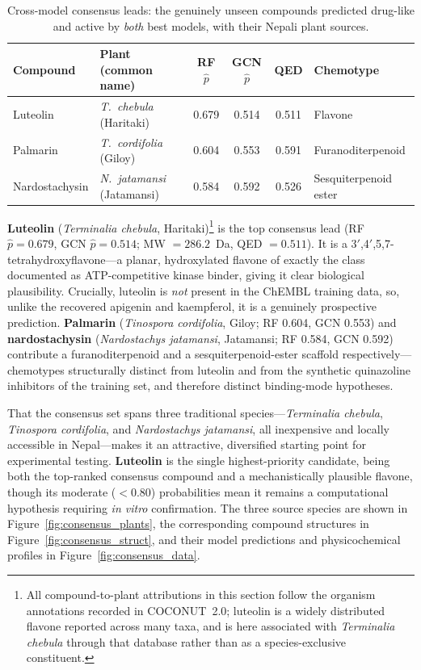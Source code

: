 \begin{table}[H]
\centering
\caption{Cross-model consensus leads: the genuinely unseen compounds predicted
         drug-like and active by \emph{both} best models, with their Nepali plant
         sources.}
\label{tab:consensus}
{\singlespacing
\begin{tabular}{llcccl}
\toprule
\textbf{Compound} & \textbf{Plant (common name)} & \textbf{RF $\hat{p}$}
                  & \textbf{GCN $\hat{p}$} & \textbf{QED} & \textbf{Chemotype} \\
\midrule
Luteolin       & \textit{T.~chebula} (Haritaki)    & 0.679 & 0.514 & 0.511 & Flavone \\
Palmarin       & \textit{T.~cordifolia} (Giloy)    & 0.604 & 0.553 & 0.591 & Furanoditerpenoid \\
Nardostachysin & \textit{N.~jatamansi} (Jatamansi) & 0.584 & 0.592 & 0.526 & Sesquiterpenoid ester \\
\bottomrule
\end{tabular}
}
\end{table}

\textbf{Luteolin} (\textit{Terminalia chebula}, Haritaki)\footnote{All
compound-to-plant attributions in this section follow the organism annotations
recorded in COCONUT~2.0; luteolin is a widely distributed flavone reported across
many taxa, and is here associated with \textit{Terminalia chebula} through that
database rather than as a species-exclusive constituent.} is the top consensus lead
(RF $\hat{p} = 0.679$, GCN $\hat{p} = 0.514$; MW $= 286.2$~Da, QED $= 0.511$). It is a
3$'$,4$'$,5,7-tetrahydroxyflavone---a planar, hydroxylated flavone of exactly the class
documented as ATP-competitive kinase binder, giving it clear biological plausibility.
Crucially, luteolin is \emph{not} present in the ChEMBL training data, so, unlike the
recovered apigenin and kaempferol, it is a genuinely prospective prediction.
\textbf{Palmarin} (\textit{Tinospora cordifolia}, Giloy; RF 0.604, GCN 0.553) and
\textbf{nardostachysin} (\textit{Nardostachys jatamansi}, Jatamansi; RF 0.584, GCN
0.592) contribute a furanoditerpenoid and a sesquiterpenoid-ester scaffold
respectively---chemotypes structurally distinct from luteolin and from the synthetic
quinazoline inhibitors of the training set, and therefore distinct binding-mode
hypotheses.

That the consensus set spans three traditional species---\textit{Terminalia chebula},
\textit{Tinospora cordifolia}, and \textit{Nardostachys jatamansi}, all inexpensive and
locally accessible in Nepal---makes it an attractive, diversified starting point for
experimental testing. \textbf{Luteolin} is the single highest-priority candidate,
being both the top-ranked consensus compound and a mechanistically plausible flavone,
though its moderate ($<0.80$) probabilities mean it remains a computational hypothesis
requiring \textit{in vitro} confirmation. The three source species are shown in
Figure~\ref{fig:consensus_plants}, the corresponding compound structures in
Figure~\ref{fig:consensus_struct}, and their model predictions and physicochemical
profiles in Figure~\ref{fig:consensus_data}.

